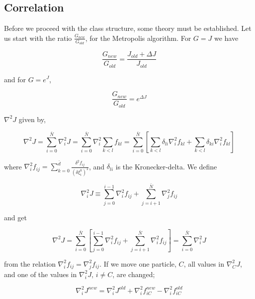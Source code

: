 \subsection{Correlation}

Before we proceed with the class structure, some theory must be
established. Let us start with the ratio
$\frac{G_{new}}{G_{old}}$, for the Metropolis algorithm. For $G=J$ we
have 

\begin{equation}
  \frac{G_{new}}{G_{old}} = \frac{J_{old}+\Delta J}{J_{old}}
\end{equation}

and for $G=e^J$,

\begin{equation}
  \frac{G_{new}}{G_{old}} = e^{\Delta J}
\end{equation}

$\nabla^2 J$ given by, 

\begin{equation}
  \nabla^2 J = \sum_{i=0}^{\bar{N}} \nabla_i^2 J =
  \sum_{i=0}^{\bar{N}} \nabla_i^2 \sum_{k<l} f_{kl} = 
  \sum_{i=0}^{\bar{N}} \left[ \sum_{k<l} \delta_{li} \nabla_i^2 f_{kl}
  + \sum_{k<l} \delta_{ki} \nabla_i^2 f_{kl} \right]
\end{equation}

where $\nabla_i^2 f_{ij} = \sum_{k=0}^{\bar{d}} \frac{\delta^2
  f_{ij}}{(\delta \xi_i^k)^2}$, and $\delta_{li}$ is the
Kronecker-delta. We define

\begin{equation}
  \nabla_i^2 J \equiv \sum_{j=0}^{i-1} \nabla_i^2 f_{ij}  +
  \sum_{j=i+1}^{\bar{N}} \nabla_j^2 f_{ij}
\end{equation}

and get 

\begin{equation}
  \nabla^2 J = \sum_{i=0}^{\bar{N}} \left[ \sum_{j=0}^{i-1} \nabla_i^2 f_{ij}
  + \sum_{j=i+1}^{\bar{N}} \nabla_i^2 f_{ij} \right] =
  \sum_{i=0}^{\bar{N}} \nabla_i^2 J
\end{equation}

from the relation $\nabla_i^2 f_{ij} = \nabla_j^2 f_{ij}$. If we move
one particle, $C$, all values in $\nabla^2_C J$, and one of the values
in $\nabla^2_i J$, $i\ne C$, are changed;

\begin{equation}
  \nabla_i^2 J^{new} = \nabla_i^2 J^{old} + \nabla_i^2 f_{iC}^{new} - \nabla_i^2 f_{iC}^{old}
\end{equation}

